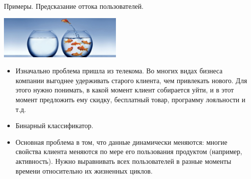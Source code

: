 \documentclass[9pt]{beamer}
\begin{document}
\begin{frame}{Примеры. Предсказание оттока пользователей.}
\begin{center}\includegraphics[height=80px]{img/intro_user_churn.jpg}\end{center}
    \begin{itemize}
        \item Изначально проблема пришла из телекома. Во многих видах бизнеса компании выгоднее удерживать старого клиента, чем привлекать нового. Для этого нужно понимать, в какой момент клиент собирается уйти, и в этот момент предложить ему скидку, бесплатный товар, программу лояльности и т.д.
        \item Бинарный классификатор.
        \item Основная проблема в том, что данные динамически меняются: многие свойства клиента меняются по мере его пользования продуктом (например, активность). Нужно выравнивать всех пользователей в разные моменты времени относительно их жизненных циклов.
    \end{itemize}
\end{frame}
\end{document}
